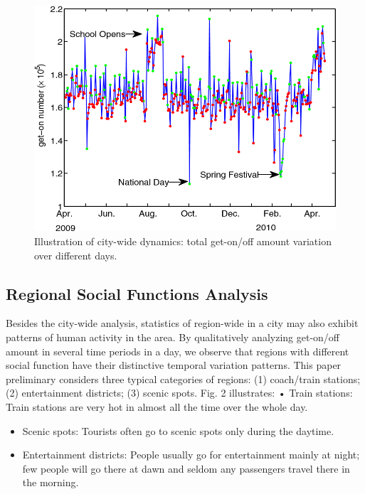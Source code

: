 \documentclass[a4paper, 10pt, conference]{ieeeconf}      %
\begin{document}
\begin{figure}[htbp]
    \centering
    \includegraphics{fig/f1.png}
    \caption{Illustration of city-wide dynamics: total get-on/off amount variation over different days.}
    \label{fig:my_label_1}
\end{figure}

\subsection{Regional Social Functions Analysis}Besides the city-wide analysis, statistics of region-wide in a city may also exhibit patterns of human activity in the area. By qualitatively analyzing get-on/off amount in several time periods in a day, we observe that regions with different social function have their distinctive temporal variation patterns.
This paper preliminary considers three typical categories of regions: (1) coach/train stations; (2) entertainment districts; (3) scenic spots. Fig. 2 illustrates: • Train stations: Train stations are very hot in almost all the time over the whole day.


\begin{itemize}

\item Scenic spots: Tourists often go to scenic spots only during the daytime.
\item Entertainment districts: People usually go for entertainment mainly at night; few people will go there at dawn and seldom any passengers travel there in the morning.

\end{itemize}
\end{document}
